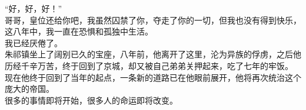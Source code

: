 \begin{multicols}{\theparacolNo}
“好，好，好！”\\

哥哥，皇位还给你吧，我虽然囚禁了你，夺走了你的一切，但我也没有得到快乐，这八年中，我一直在恐惧和孤独中生活。\\

我已经厌倦了。\\

朱祁镇坐上了阔别已久的宝座，八年前，他离开了这里，沦为异族的俘虏，之后他历经千辛万苦，终于回到了京城，却又被自己弟弟关押起来，吃了七年的牢饭。\\

现在他终于回到了当年的起点，一条新的道路已在他眼前展开，他将再次统治这个庞大的帝国。\\

很多的事情即将开始，很多人的命运即将改变。\\
\ifnum{}
	\end{multicols}
\fi